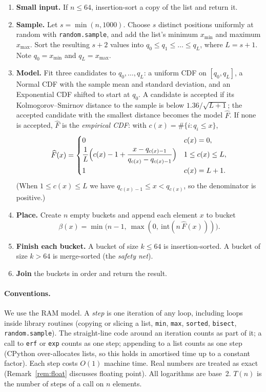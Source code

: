\documentclass[11pt]{article}
\theoremstyle{definition}
\theoremstyle{remark}
\newcommand{\Fh}{\widehat{F}}
\newcommand{\code}[1]{\texttt{#1}}
\newcommand{\xmin}{x_{\min}}
\newcommand{\xmax}{x_{\max}}
\begin{document}
\begin{enumerate}[label=\textbf{D\arabic*.},leftmargin=3em]
\item \textbf{Small input.} If $n\le 64$, insertion-sort a copy of the list
  and return it.
\item \textbf{Sample.} Let $s=\min(n,1000)$. Choose $s$ distinct positions
  uniformly at random with \code{random.sample}, and add the list's minimum
  $\xmin$ and maximum $\xmax$. Sort the resulting $s+2$ values into
  $q_0\le q_1\le\dots\le q_L$, where $L=s+1$. Note $q_0=\xmin$ and
  $q_L=\xmax$.
\item \textbf{Model.} Fit three candidates to $q_0,\dots,q_L$: a uniform CDF
  on $[q_0,q_L]$, a Normal CDF with the sample mean and standard deviation,
  and an Exponential CDF shifted to start at $q_0$. A candidate is accepted
  if its Kolmogorov--Smirnov distance to the sample is below
  $1.36/\sqrt{L+1}$; the accepted candidate with the smallest distance
  becomes the model $\Fh$. If none is accepted, $\Fh$ is the
  \emph{empirical CDF}: with $c(x)=\#\{i:q_i\le x\}$,
  \[
  \Fh(x)=
  \begin{cases}
  0 & c(x)=0,\\[2pt]
  \dfrac{1}{L}\Bigl(c(x)-1+\dfrac{x-q_{c(x)-1}}{q_{c(x)}-q_{c(x)-1}}\Bigr) & 1\le c(x)\le L,\\[8pt]
  1 & c(x)=L+1.
  \end{cases}
  \]
  (When $1\le c(x)\le L$ we have $q_{c(x)-1}\le x<q_{c(x)}$, so the
  denominator is positive.)
\item \textbf{Place.} Create $n$ empty buckets and append each element $x$
  to bucket
  \[
  \beta(x)=\min\bigl(n-1,\ \max(0,\ \mathrm{int}(n\,\Fh(x)))\bigr).
  \]
\item \textbf{Finish each bucket.} A bucket of size $k\le 64$ is
  insertion-sorted. A bucket of size $k>64$ is merge-sorted (the
  \emph{safety net}).
\item \textbf{Join} the buckets in order and return the result.
\end{enumerate}

\paragraph{Conventions.} We use the RAM model. A \emph{step} is one
iteration of any loop, including loops inside library routines (copying or
slicing a list, \code{min}, \code{max}, \code{sorted}, \code{bisect},
\code{random.sample}). The straight-line code around an iteration counts as
part of it; a call to \code{erf} or \code{exp} counts as one step; appending
to a list counts as one step (CPython over-allocates lists, so this holds in
amortised time up to a constant factor). Each step costs $O(1)$ machine
time. Real numbers are treated as exact (Remark~\ref{rem:float} discusses
floating point). All logarithms are base~2. $T(n)$ is the number of steps
of a call on $n$ elements.
\end{document}
